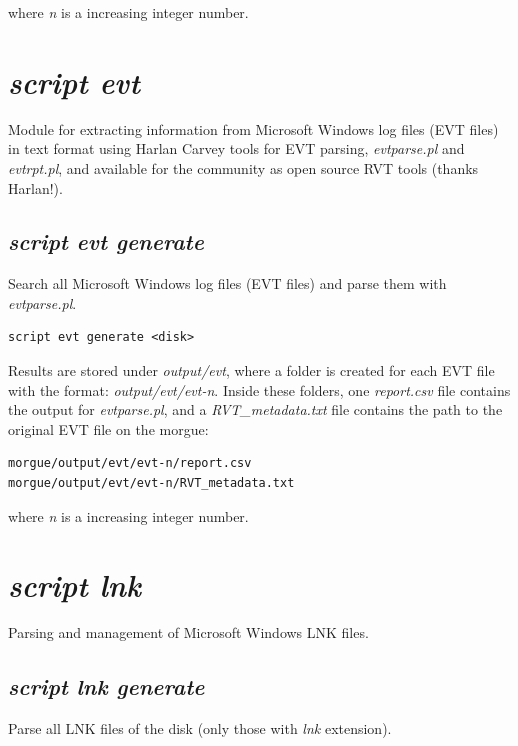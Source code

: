 \documentclass[a4paper,11pt,oneside]{report}
\begin{document}
where \emph{n} is a increasing integer number.





\section{\emph{script evt }}

Module for extracting information from Microsoft Windows log files (EVT files) in text format using Harlan Carvey tools for EVT parsing, \emph{evtparse.pl} and \emph{evtrpt.pl}, and available for the community as open source RVT tools (thanks Harlan!). 

\subsection{\emph{script evt generate}}

Search all Microsoft Windows log files (EVT files) and parse them with  \emph{evtparse.pl}.

\begin{verbatim}
script evt generate <disk>
\end{verbatim}

Results are stored under \emph{output/evt}, where a folder is created for each EVT file with the format:  \emph{output/evt/evt-n}. Inside these folders, one \emph{report.csv} file contains the output for \emph{evtparse.pl}, and a \emph{RVT\_metadata.txt} file contains the path to the original EVT file on the morgue:

\begin{verbatim}
morgue/output/evt/evt-n/report.csv
morgue/output/evt/evt-n/RVT_metadata.txt
\end{verbatim}

where \emph{n} is a increasing integer number.






\section{\emph{script lnk}}


Parsing and management of Microsoft Windows LNK files.

\subsection{\emph{script lnk generate}} 

Parse all LNK files of the disk (only those with \emph{lnk} extension).
\end{document}

